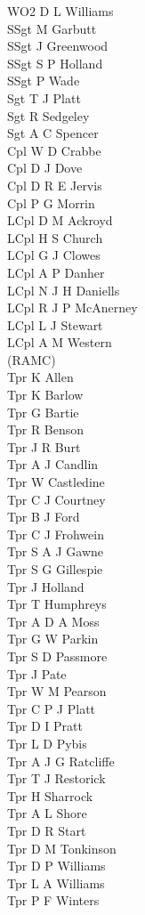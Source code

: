 \begin{multicols}{3}
  \small
  \noindent
  WO2 D L Williams \\
  SSgt M Garbutt \\
  SSgt J Greenwood \\
  SSgt S P Holland \\
  SSgt P Wade \\
  Sgt T J Platt \\
  Sgt R Sedgeley \\
  Sgt A C Spencer \\
  Cpl W D Crabbe \\
  Cpl D J Dove \\
  Cpl D R E Jervis \\
  Cpl P G Morrin \\
  LCpl D M Ackroyd \\
  LCpl H S Church \\
  LCpl G J Clowes \\
  LCpl A P Danher \\
  LCpl N J H Daniells \\
  LCpl R J P McAnerney \\
  LCpl L J Stewart \\
  LCpl A M Western \\ \indent (RAMC) \\
  Tpr K Allen \\
  Tpr K Barlow \\
  Tpr G Bartie \\
  Tpr R Benson \\
  Tpr J R Burt \\
  Tpr A J Candlin \\
  Tpr W Castledine \\
  Tpr C J Courtney \\
  Tpr B J Ford \\
  Tpr C J Frohwein \\
  Tpr S A J Gawne \\
  Tpr S G Gillespie \\
  Tpr J Holland \\
  Tpr T Humphreys \\
  Tpr A D A Moss \\
  Tpr G W Parkin \\
  Tpr S D Passmore \\
  Tpr J Pate \\
  Tpr W M Pearson \\
  Tpr C P J Platt \\
  Tpr D I Pratt \\
  Tpr L D Pybis \\
  Tpr A J G Ratcliffe \\
  Tpr T J Restorick \\
  Tpr H Sharrock \\
  Tpr A L Shore \\
  Tpr D R Start \\
  Tpr D M Tonkinson \\
  Tpr D P Williams \\
  Tpr L A Williams \\
  Tpr P F Winters
\end{multicols}

\pagebreak
